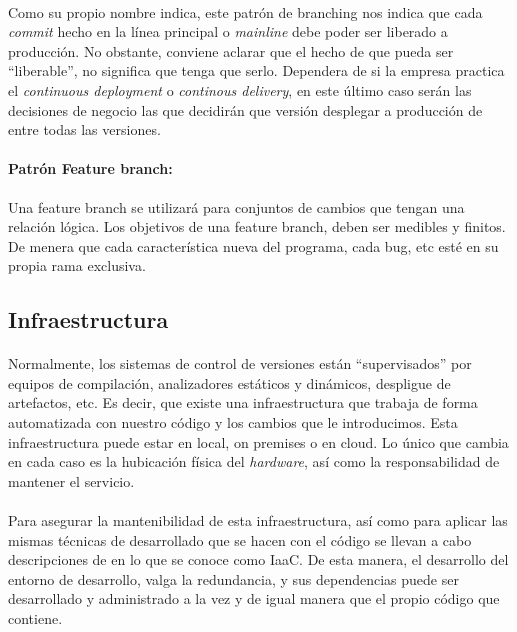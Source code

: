 \paragraph{}Como su propio nombre indica, este patrón de branching nos indica que cada
\emph{commit} hecho en la línea principal o \emph{mainline} debe poder ser liberado a
producción. No obstante, conviene aclarar que el hecho de que pueda ser ``liberable'',
no significa que tenga que serlo. Dependera de si la empresa practica el \emph{continuous
deployment} o \emph{continous delivery}, en este último caso serán las decisiones de
negocio las que decidirán que versión desplegar a producción de entre todas las versiones.


\paragraph{Patrón Feature branch:} Una feature branch se utilizará para conjuntos de
cambios que tengan una relación lógica. Los objetivos de una feature branch, deben ser
medibles y finitos. De menera que cada característica nueva del programa, cada bug, etc
esté en su propia rama exclusiva.

\subsection{Infraestructura}

\paragraph{}Normalmente, los sistemas de control de versiones están ``supervisados''
por equipos de compilación, analizadores estáticos y dinámicos, despligue de artefactos,
etc. Es decir, que existe una infraestructura que trabaja de forma automatizada con
nuestro código y los cambios que le introducimos. Esta infraestructura puede estar
en local, \gls{on premises} o en cloud. Lo único que cambia en cada caso es la hubicación
física del \emph{hardware}, así como la responsabilidad de mantener el servicio.

\paragraph{}Para asegurar la mantenibilidad de esta infraestructura, así como para aplicar
las mismas técnicas de desarrollado que se hacen con el código se llevan a cabo descripciones
de  en lo que se conoce como \gls{IaaC}. De esta manera, el desarrollo
del entorno de desarrollo, valga la redundancia, y sus dependencias puede ser desarrollado
y administrado a la vez y de igual manera que el propio código que contiene.

